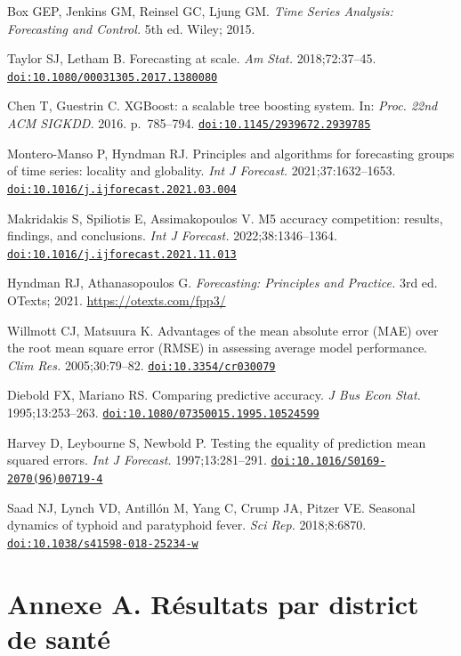 \documentclass[11pt]{article}
\begin{document}
\begin{enumerate}[label={[\arabic*]},leftmargin=2.2em,itemsep=0.5pt]
\item\hypertarget{ref18}{}Box GEP, Jenkins GM, Reinsel GC, Ljung GM. \textit{Time Series Analysis: Forecasting and Control.} 5th ed. Wiley; 2015.
\item\hypertarget{ref19}{}Taylor SJ, Letham B. Forecasting at scale. \textit{Am Stat.} 2018;72:37--45. \href{https://doi.org/10.1080/00031305.2017.1380080}{\nolinkurl{doi:10.1080/00031305.2017.1380080}}
\item\hypertarget{ref20}{}Chen T, Guestrin C. XGBoost: a scalable tree boosting system. In: \textit{Proc. 22nd ACM SIGKDD.} 2016. p.~785--794. \href{https://doi.org/10.1145/2939672.2939785}{\nolinkurl{doi:10.1145/2939672.2939785}}
\item\hypertarget{ref21}{}Montero-Manso P, Hyndman RJ. Principles and algorithms for forecasting groups of time series: locality and globality. \textit{Int J Forecast.} 2021;37:1632--1653. \href{https://doi.org/10.1016/j.ijforecast.2021.03.004}{\nolinkurl{doi:10.1016/j.ijforecast.2021.03.004}}
\item\hypertarget{ref22}{}Makridakis S, Spiliotis E, Assimakopoulos V. M5 accuracy competition: results, findings, and conclusions. \textit{Int J Forecast.} 2022;38:1346--1364. \href{https://doi.org/10.1016/j.ijforecast.2021.11.013}{\nolinkurl{doi:10.1016/j.ijforecast.2021.11.013}}
\item\hypertarget{ref23}{}Hyndman RJ, Athanasopoulos G. \textit{Forecasting: Principles and Practice.} 3rd ed. OTexts; 2021. \url{https://otexts.com/fpp3/}
\item\hypertarget{ref24}{}Willmott CJ, Matsuura K. Advantages of the mean absolute error (MAE) over the root mean square error (RMSE) in assessing average model performance. \textit{Clim Res.} 2005;30:79--82. \href{https://doi.org/10.3354/cr030079}{\nolinkurl{doi:10.3354/cr030079}}
\item\hypertarget{ref25}{}Diebold FX, Mariano RS. Comparing predictive accuracy. \textit{J Bus Econ Stat.} 1995;13:253--263. \href{https://doi.org/10.1080/07350015.1995.10524599}{\nolinkurl{doi:10.1080/07350015.1995.10524599}}
\item\hypertarget{ref26}{}Harvey D, Leybourne S, Newbold P. Testing the equality of prediction mean squared errors. \textit{Int J Forecast.} 1997;13:281--291. \href{https://doi.org/10.1016/S0169-2070(96)00719-4}{\nolinkurl{doi:10.1016/S0169-2070(96)00719-4}}
\item\hypertarget{ref27}{}Saad NJ, Lynch VD, Antillón M, Yang C, Crump JA, Pitzer VE. Seasonal dynamics of typhoid and paratyphoid fever. \textit{Sci Rep.} 2018;8:6870. \href{https://doi.org/10.1038/s41598-018-25234-w}{\nolinkurl{doi:10.1038/s41598-018-25234-w}}
\end{enumerate}

\normalsize
\section*{Annexe A. Résultats par district de santé}

\end{document}
